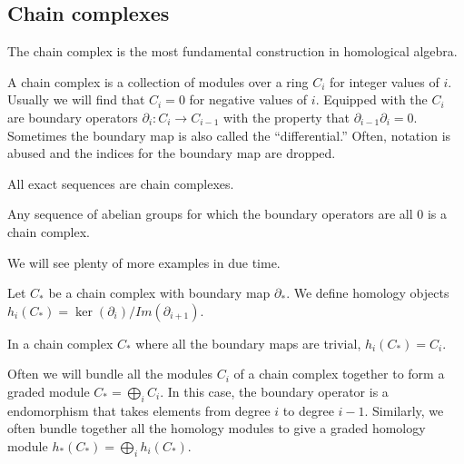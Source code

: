 \subsection{Chain complexes}
The chain complex is the most fundamental construction in
homological algebra.
\begin{definition} A chain complex is a collection of modules
over a ring $C_i$
for integer values of $i$. Usually we will find that $C_i=0$ for
negative values of $i$. Equipped with the $C_i$ are boundary
operators
$\partial_i:C_i\rightarrow C_{i-1}$ with the property that
$\partial_{i-1}\partial_i=0$. Sometimes the boundary map is also
called the
``differential.'' Often, notation is abused and the indices for
the boundary map are dropped.\end{definition}
\begin{example} All exact sequences are chain complexes.
\end{example}
\begin{example} Any sequence of abelian groups for which the
boundary operators
are all $0$ is a chain complex. \end{example}
We will see plenty of more examples in due time.
\begin{definition} Let $C_*$ be a chain complex with boundary
map $\partial_*$.
We define homology objects
$h_i(C_*)=\ker(\partial_i)/Im(\partial_{i+1})$.
\end{definition}
\begin{example} In a chain complex $C_*$ where all the boundary
maps are
trivial, $h_i(C_*)=C_i$. \end{example}

Often we will bundle all the modules $C_i$ of a chain complex
together to form a graded module $C_*=\bigoplus_i C_i$. In this
case, the boundary operator is a
endomorphism that takes elements from degree $i$ to degree
$i-1$. Similarly, we
often bundle together all the homology modules to give a graded
homology module
$h_*(C_*)=\bigoplus_i h_i(C_*)$.

